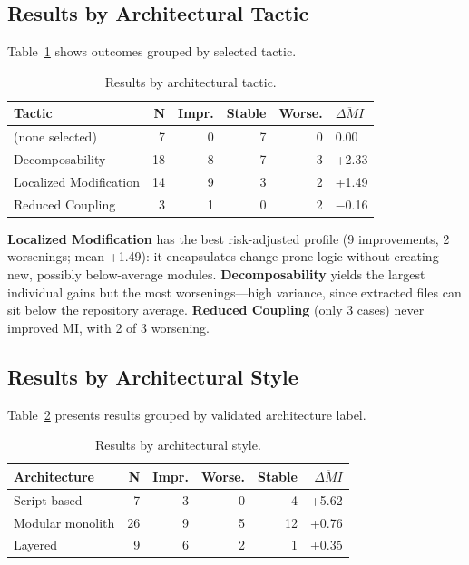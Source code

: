 \documentclass[runningheads]{llncs}
\begin{document}
\subsection{Results by Architectural Tactic}

Table~\ref{tab:exp5_tactics} shows outcomes grouped by selected tactic.

\begin{table}[H]
\centering
\small
\caption{Results by architectural tactic.}
\label{tab:exp5_tactics}
\begin{tabular}{lrrrrl}
\toprule
\textbf{Tactic} & \textbf{N} & \textbf{Impr.} & \textbf{Stable} & \textbf{Worse.} & $\overline{\Delta MI}$ \\
\midrule
(none selected)       & 7  & 0 & 7 & 0 & 0.00  \\
Decomposability       & 18 & 8 & 7 & 3 & +2.33 \\
Localized Modification & 14 & 9 & 3 & 2 & +1.49 \\
Reduced Coupling      & 3  & 1 & 0 & 2 & $-$0.16 \\
\bottomrule
\end{tabular}
\end{table}

\textbf{Localized Modification} has the best risk-adjusted profile (9 improvements, 2 worsenings; mean +1.49): it encapsulates change-prone logic without creating new, possibly below-average modules. \textbf{Decomposability} yields the largest individual gains but the most worsenings---high variance, since extracted files can sit below the repository average. \textbf{Reduced Coupling} (only 3 cases) never improved MI, with 2 of 3 worsening.

\subsection{Results by Architectural Style}

Table~\ref{tab:exp5_arch} presents results grouped by validated architecture label.

\begin{table}[H]
\centering
\small
\caption{Results by architectural style.}
\label{tab:exp5_arch}
\begin{tabular}{lrrrrr}
\toprule
\textbf{Architecture} & \textbf{N} & \textbf{Impr.} & \textbf{Worse.} & \textbf{Stable} & $\overline{\Delta MI}$ \\
\midrule
Script-based      & 7  & 3 & 0 & 4 & +5.62 \\
Modular monolith  & 26 & 9 & 5 & 12 & +0.76 \\
Layered           & 9  & 6 & 2 & 1  & +0.35 \\
\bottomrule
\end{tabular}
\end{table}
\end{document}
